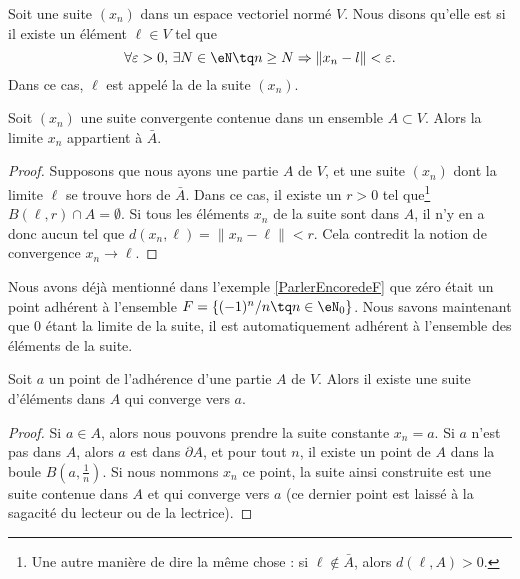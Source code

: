 \begin{definition}		\label{DefCvSuiteEGVN}
	Soit une suite $(x_n)$ dans un espace vectoriel normé $V$. Nous disons qu'elle est  si il existe un élément $\ell\in V$ tel que
	\begin{equation}
		\forall \varepsilon>0,\,\exists N\in\eN\tq n\geq N\Rightarrow \| x_n-l \|<\varepsilon.
	\end{equation}
	Dans ce cas, $\ell$ est appelé la  de la suite $(x_n)$.
\end{definition}


\begin{lemma}		\label{LemLimAbarA}
	Soit $(x_n)$ une suite convergente contenue dans un ensemble $A\subset V$. Alors la limite $x_n$ appartient à $\bar A$.
\end{lemma}

\begin{proof}
	Supposons que nous ayons une partie $A$ de $V$, et une suite $(x_n)$ dont la limite $\ell$ se trouve hors de $\bar A$. Dans ce cas, il existe un $r>0$ tel que\footnote{Une autre manière de dire la même chose : si $\ell\notin\bar A$, alors $d(\ell,A)>0$.} $B(\ell,r)\cap A=\emptyset$. Si tous les éléments $x_n$ de la suite sont dans $A$, il n'y en a donc aucun tel que $d(x_n,\ell)=\| x_n-\ell \|<r$. Cela contredit la notion de convergence $x_n\to \ell$.
\end{proof}

Nous avons déjà mentionné dans l'exemple \ref{ParlerEncoredeF} que zéro était un point adhérent à l'ensemble $F=\{ (-1)^n/n\tq n\in\eN_0 \}$. Nous savons maintenant que $0$ étant la limite de la suite, il est automatiquement adhérent à l'ensemble des éléments de la suite.

\begin{corollary}		\label{CorAdhEstLim}
	Soit $a$ un point de l'adhérence d'une partie $A$ de $V$. Alors il existe une suite d'éléments dans $A$ qui converge vers $a$.
\end{corollary}

\begin{proof}
	Si $a\in A$, alors nous pouvons prendre la suite constante $x_n=a$. Si $a$ n'est pas dans $A$, alors $a$ est dans $\partial A$, et pour tout $n$, il existe un point de $A$ dans la boule $B(a,\frac{1}{ n })$. Si nous nommons $x_n$ ce point, la suite ainsi construite est une suite contenue dans $A$ et qui converge vers $a$ (ce dernier point est laissé à la sagacité du lecteur ou de la lectrice).
\end{proof}

